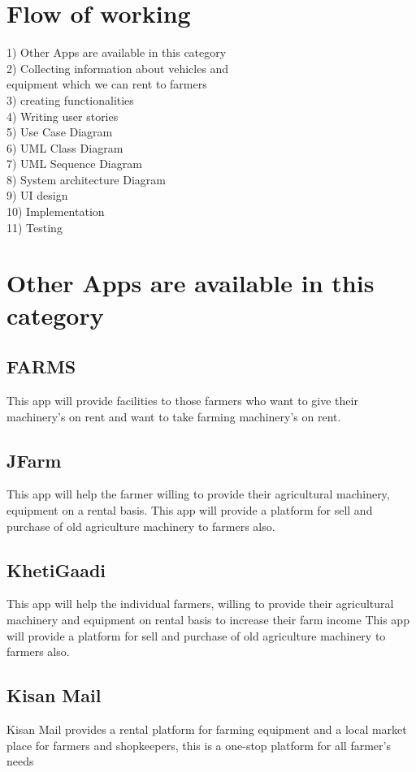 \documentclass[conference]{IEEEtran}
\begin{document}
\section{Flow of working}
1)  Other Apps are available in this category\\
2)  Collecting information about vehicles and \\
   equipment which we can rent to farmers\\
3)  creating functionalities\\
4)  Writing user stories\\
5)  Use Case Diagram\\
6)  UML Class Diagram\\
7)  UML Sequence Diagram\\
8)  System architecture Diagram\\
9)  UI design\\
10) Implementation \\
11) Testing



\section {Other Apps are available in this category}
\subsection{FARMS}
This app will provide facilities to those farmers who want to give their machinery's on rent and want to take farming machinery's on rent.
\subsection{JFarm}
This app will help the farmer willing to provide their agricultural machinery,  equipment on a rental basis. This app will provide a platform for sell and purchase of old agriculture machinery to farmers also.
\subsection{KhetiGaadi}
This app will help the individual farmers, willing to provide their agricultural machinery and equipment on rental basis to increase their farm income 
This app will   provide a platform for sell and purchase of old agriculture machinery to farmers  also.
\subsection{Kisan Mail}
Kisan Mail provides a rental platform for farming equipment and a local market place for farmers and shopkeepers, this is a one-stop platform for all farmer’s needs
\end{document}
